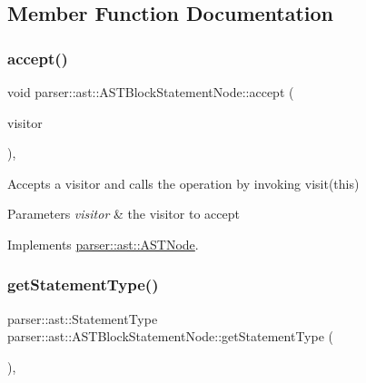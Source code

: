 \subsection{Member Function Documentation}
\mbox{\label{classparser_1_1ast_1_1ASTBlockStatementNode_ae0e7e04747661471aade0c1509c37422}} 
\subsubsection{\texorpdfstring{accept()}{accept()}}
{\footnotesize\ttfamily void parser\+::ast\+::\+A\+S\+T\+Block\+Statement\+Node\+::accept (\begin{DoxyParamCaption}\item[{\hyperlink{classvisitor_1_1Visitor}{visitor\+::\+Visitor} $\ast$}]{visitor }\end{DoxyParamCaption})\hspace{0.3cm}{\ttfamily [override]}, {\ttfamily [virtual]}}

Accepts a visitor and calls the operation by invoking {\ttfamily visit(this)} 
\begin{DoxyParams}{Parameters}
{\em visitor} & the visitor to accept \\
\hline
\end{DoxyParams}


Implements \hyperlink{classparser_1_1ast_1_1ASTNode_a3ff84fdfdbbc5c39b70b4d04c22e7dc3}{parser\+::ast\+::\+A\+S\+T\+Node}.

\mbox{\label{classparser_1_1ast_1_1ASTBlockStatementNode_aec80a6d582f0b9691dbd33d0d5ecb975}} 
\subsubsection{\texorpdfstring{get\+Statement\+Type()}{getStatementType()}}
{\footnotesize\ttfamily parser\+::ast\+::\+Statement\+Type parser\+::ast\+::\+A\+S\+T\+Block\+Statement\+Node\+::get\+Statement\+Type (\begin{DoxyParamCaption}{ }\end{DoxyParamCaption})\hspace{0.3cm}{\ttfamily [override]}, {\ttfamily [virtual]}}

